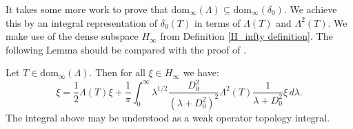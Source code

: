     It takes some more work to prove that $\mathrm{dom}_\infty(\Lambda)\subseteq \mathrm{dom}_\infty(\delta_0)$. We achieve this by an integral representation of $\delta_0(T)$
    in terms of $\Lambda(T)$ and $\Lambda^2(T)$. We make use of the dense subspace $H_\infty$ from Definition \ref{H_infty definition}. 
    The following Lemma should be compared with the proof of \cite[Lemma B2]{Connes-Moscovici}.
    \begin{lem}\label{delta to lambda}
        Let $T\in \mathrm{dom}_\infty(\Lambda)$. Then for all $\xi \in H_\infty$ we have:
        \begin{equation*}
            [|D_0|,T]\xi = \frac{1}{2}\Lambda(T)\xi + \frac{1}{\pi}\int_0^\infty \lambda^{1/2} \frac{D_0^2}{(\lambda+D_0^2)^2}\Lambda^2(T)\frac{1}{\lambda+D_0^2}\xi\,d\lambda.
        \end{equation*}
        The integral above may be understood as a weak operator topology integral.
    \end{lem}
